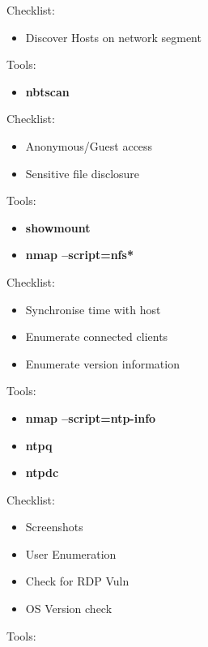 \documentclass[a4paper,10pt]{article}
\begin{document}
\begin{multicols}{2}
\begin{tcolorbox}[breakable, title=MYSQL/MariaDB]
\end{tcolorbox}
\begin{tcolorbox}[breakable,title=NETBIOS]
Checklist:
\begin{itemize}
	\itemsep0em
	\item Discover Hosts on network segment
\end{itemize}
Tools:
\begin{itemize}
	\itemsep0em
	\item \textbf{nbtscan}
\end{itemize}
\end{tcolorbox}
\begin{tcolorbox}[breakable, title=NFS]
Checklist:
\begin{itemize}
	\itemsep0em
	\item Anonymous/Guest access
	\item Sensitive file disclosure
\end{itemize}
Tools:
\begin{itemize}
	\itemsep0em
	\item \textbf{showmount}
	\item \textbf{nmap --script=nfs*}
\end{itemize}
\end{tcolorbox}
\begin{tcolorbox}[breakable,title=NTP]
Checklist:
\begin{itemize}
	\itemsep0em
	\item Synchronise time with host
	\item Enumerate connected clients
	\item Enumerate version information
\end{itemize}
Tools:
\begin{itemize}
	\itemsep0em
	\item \textbf{nmap --script=ntp-info}
	\item \textbf{ntpq}
	\item \textbf{ntpdc}
\end{itemize}
\end{tcolorbox}
\begin{tcolorbox}[breakable, title=RDP]
Checklist:
\begin{itemize}
	\itemsep0em
	\item Screenshots
	\item User Enumeration
	\item Check for RDP Vuln
	\item OS Version check
\end{itemize}
Tools:
\begin{itemize}

\end{itemize}
\end{tcolorbox}
\end{multicols}
\end{document}

